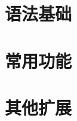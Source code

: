 \documentclass[10pt,a4paper]{report}
\begin{document}
	\part{语法基础}
		

		

		

		

		

		

		

		
	\part{常用功能}

		

		

	\part{其他扩展}
\end{document}
